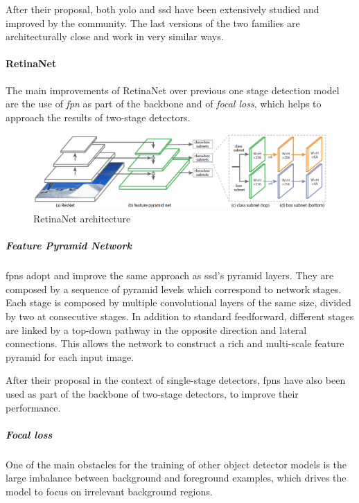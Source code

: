 \documentclass[%
    corpo=12pt,
    twoside,
    stile=classica,   
    tipotesi=magistrale,
    evenboxes,
    english
]{toptesi}
\begin{document}
After their proposal, both \gls{yolo} and \gls{ssd} have been extensively studied and improved by the community. The last versions of the two families are architecturally close and work in very similar ways.

\paragraph{RetinaNet}
The main improvements of RetinaNet\cite{lin2018focal} over previous one stage detection model are the use of \textit{\acrfull{fpn}} as part of the backbone and of \textit{focal loss}, which helps to approach the results of two-stage detectors.

\begin{figure}[ht!]
	\centering
	\includegraphics[width=0.8\linewidth]{imgs/retinanet.png}
	\caption{RetinaNet architecture\cite{lin2018focal}}
	\label{fig:retinanet}
\end{figure}

\subparagraph{Feature Pyramid Network}
\glspl{fpn}\cite{lin2017feature} adopt and improve the same approach as \acrshort{ssd}'s pyramid layers. They are composed by a sequence of pyramid levels which correspond to network stages. Each stage is composed by multiple convolutional layers of the same size, divided by two at consecutive stages. In addition to standard feedforward, different stages are linked by a top-down pathway in the opposite direction and lateral connections. This allows the network to construct a rich and multi-scale feature pyramid for each input image.

After their proposal in the context of single-stage detectors, \glspl{fpn} have also been used as part of the backbone of two-stage detectors, to improve their performance.

\subparagraph{Focal loss}
One of the main obstacles for the training of  other object detector models is the large imbalance between background and foreground examples, which drives the model to focus on irrelevant background regions.
\end{document}
